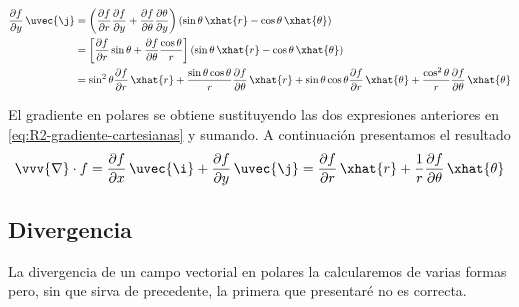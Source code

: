 {\small
  \begin{subequations}
    \begin{align*}
      \dfrac{\partial f}{\partial y}\,\uvec{\j}
      &=
        \left(%
        \dfrac{\partial f}{\partial r}\dfrac{\partial f}{\partial y}
        + \dfrac{\partial f}{\partial\theta}\dfrac{\partial\theta}{\partial y}
        \right)
        \left(%
        \sin\theta\,\xhat{r}-\cos\theta\,\xhat{\theta}
        \right)\\
      &=
        \left[%
        \dfrac{\partial f}{\partial r}\sin\theta
        + \dfrac{\partial f}{\partial\theta}\dfrac{\cos\theta}{r}
        \right]
        \left(%
        \sin\theta\,\xhat{r} - \cos\theta\,\xhat{\theta}
        \right)\\
      &=
        \sin^2\theta\dfrac{\partial f}{\partial r}\,\xhat{r}
        + \dfrac{\sin\theta\cos\theta}{r}\dfrac{\partial f}{\partial\theta}\,\xhat{r}
        + \sin\theta\cos\theta\dfrac{\partial f}{\partial r}\,\xhat{\theta}
        + \dfrac{\cos^2\theta}{r}\dfrac{\partial f}{\partial\theta}\,\xhat{\theta}
    \end{align*}
  \end{subequations}
}

El gradiente en polares se obtiene sustituyendo las dos expresiones anteriores en
\eqref{eq:R2-gradiente-cartesianas} y sumando. A continuación presentamos el resultado
{\small
  \begin{equation}\label{eq:R2-gradiente-polares}
    \vvv{\nabla}\cdot f
    =
      \dfrac{\partial f}{\partial x}\,\uvec{\i}
      + \dfrac{\partial f}{\partial y}\,\uvec{\j}
      = \dfrac{\partial f}{\partial r}\,\xhat{r}
      + \dfrac{1}{r}\dfrac{\partial f}{\partial\theta}\,\xhat{\theta}
  \end{equation}
}

\subsection{Divergencia}
La divergencia de un campo vectorial en polares la calcularemos de varias formas pero,
sin que sirva de precedente, la primera que presentaré no es correcta.

